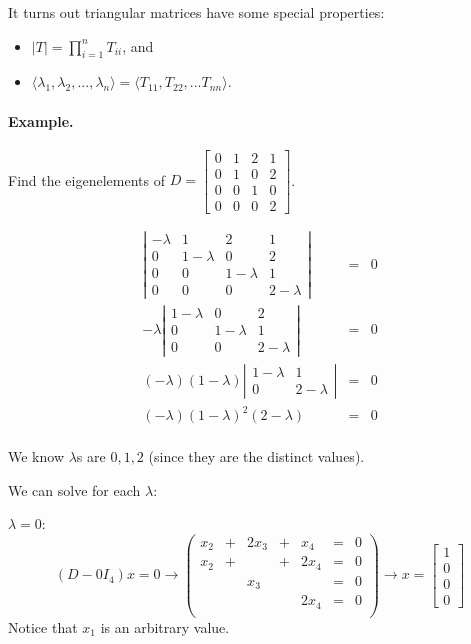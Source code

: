 It turns out triangular matrices have some special properties: 
\begin{itemize}
\item $\displaystyle |T| = \prod_{i=1}^n T_{ii}$, and 
\item $\langle \lambda_1, \lambda_2, ..., \lambda_n\rangle = \langle T_{11}, T_{22}, ... T_{nn}\rangle$. 
\end{itemize}

\paragraph{Example.} Find the eigenelements of $D=\begin{bmatrix}0&1&2&1\\0&1&0&2\\0&0&1&0\\0&0&0&2\end{bmatrix}$.

\[\begin{array}{rcl}
\left|\begin{matrix}-\lambda&1&2&1\\0&1-\lambda&0&2\\0&0&1-\lambda&1\\0 & 0 & 0 & 2-\lambda\end{matrix}\right| & = & 0\\
-\lambda\left|\begin{matrix}1-\lambda&0&2\\0&1-\lambda&1\\0 & 0 & 2-\lambda\end{matrix}\right| & = & 0\\
(-\lambda)(1-\lambda)\left|\begin{matrix}1-\lambda&1\\0 & 2-\lambda\end{matrix}\right| & = & 0\\
(-\lambda)(1-\lambda)^2(2-\lambda) & = & 0\\
\end{array}\]

We know $\lambda$s are $0,1,2$ (since they are the distinct values). 

We can solve for each $\lambda$:

$\lambda=0$: 
\[(D-0I_4)x = 0 \rightarrow \left(\begin{array}{rcrcrcr} x_2 & + & 2x_3 & + & x_4 & = & 0\\ x_2 & + &  & + & 2x_4 & = & 0\\ &  & x_3 &&&  = & 0\\ & &&& 2x_4 & = & 0\\\end{array}\right)\rightarrow x = \begin{bmatrix}1\\0\\0\\0\end{bmatrix}\]
Notice that $x_1$ is an arbitrary value. 

